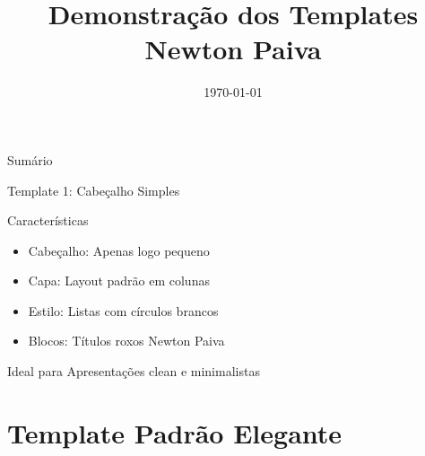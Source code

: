 \documentclass[aspectratio=169]{beamer}
\title{Demonstração dos Templates Newton Paiva}
\date{\today}
\begin{document}

\begin{frame}
    \maketitle
\end{frame}

\begin{frame}{Sumário}
    \tableofcontents
\end{frame}

\begin{frame}{Template 1: Cabeçalho Simples}
    \begin{block}{Características}
        \begin{itemize}
            \item Cabeçalho: Apenas logo pequeno
            \item Capa: Layout padrão em colunas
            \item Estilo: Listas com círculos brancos
            \item Blocos: Títulos roxos Newton Paiva
        \end{itemize}
    \end{block}
    
    \begin{alertblock}{Ideal para}
        Apresentações clean e minimalistas
    \end{alertblock}
\end{frame}


\section{Template Padrão Elegante}
\end{document}
